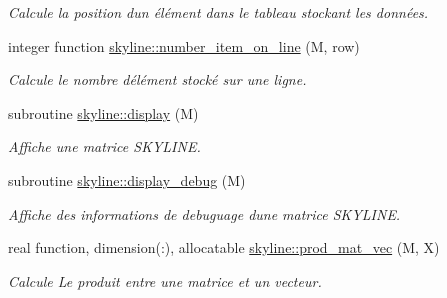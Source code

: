 \begin{DoxyCompactItemize}
\begin{DoxyCompactList}\small\item\em Calcule la position d\textquotesingle{}un élément dans le tableau stockant les données. \end{DoxyCompactList}\item 
integer function \hyperlink{namespaceskyline_a9f07218be321c12bea1d84f6b629e346}{skyline\+::number\+\_\+item\+\_\+on\+\_\+line} (M, row)
\begin{DoxyCompactList}\small\item\em Calcule le nombre d\textquotesingle{}élément stocké sur une ligne. \end{DoxyCompactList}\item 
subroutine \hyperlink{namespaceskyline_a428818245223fbf6e3a5a2264f8f1a65}{skyline\+::display} (M)
\begin{DoxyCompactList}\small\item\em Affiche une matrice S\+K\+Y\+L\+I\+NE. \end{DoxyCompactList}\item 
subroutine \hyperlink{namespaceskyline_aedb0d55aecd5f4cae4dc3593a5e89f0f}{skyline\+::display\+\_\+debug} (M)
\begin{DoxyCompactList}\small\item\em Affiche des informations de debuguage d\textquotesingle{}une matrice S\+K\+Y\+L\+I\+NE. \end{DoxyCompactList}\item 
real function, dimension(\+:), allocatable \hyperlink{namespaceskyline_ae156a973c4a30bd2740af6ef2fdfa1d9}{skyline\+::prod\+\_\+mat\+\_\+vec} (M, X)
\begin{DoxyCompactList}\small\item\em Calcule Le produit entre une matrice et un vecteur. \end{DoxyCompactList}\end{DoxyCompactItemize}

